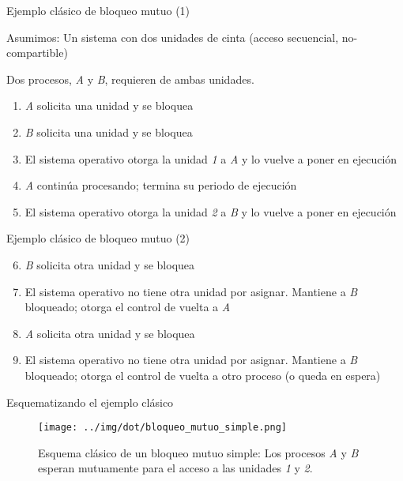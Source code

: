 \documentclass[presentation]{beamer}
\begin{document}
\begin{frame}[label={sec:org3f34a5a}]{Ejemplo clásico de bloqueo mutuo (1)}
\begin{center}
Asumimos: Un sistema con dos unidades de cinta (acceso secuencial,
no-compartible)

Dos procesos, \emph{A} y \emph{B}, requieren de ambas unidades.
\end{center}

\begin{enumerate}
\item \emph{A} solicita una unidad y se bloquea

\item \emph{B} solicita una unidad y se bloquea

\item El sistema operativo otorga la unidad \emph{1} a \emph{A} y lo vuelve a poner
en ejecución

\item \emph{A} continúa procesando; termina su periodo de ejecución

\item El sistema operativo otorga la unidad \emph{2} a \emph{B} y lo vuelve a poner
en ejecución
\end{enumerate}
\end{frame}

\begin{frame}[label={sec:orgf90b6e7}]{Ejemplo clásico de bloqueo mutuo (2)}
\begin{enumerate}
\setcounter{enumi}{5}
\item \emph{B} solicita otra unidad y se bloquea

\item El sistema operativo no tiene otra unidad por asignar. Mantiene a
\emph{B} bloqueado; otorga el control de vuelta a \emph{A}

\item \emph{A} solicita otra unidad y se bloquea

\item El sistema operativo no tiene otra unidad por asignar. Mantiene a
\emph{B} bloqueado; otorga el control de vuelta a otro proceso (o queda
en espera)
\end{enumerate}
\end{frame}

\begin{frame}[label={sec:org825a86d}]{Esquematizando el ejemplo clásico}
\begin{figure}[htbp]
\centering
\texttt{[image: ../img/dot/bloqueo\_mutuo\_simple.png]}
\caption{Esquema clásico de un bloqueo mutuo simple: Los procesos \emph{A} y \emph{B} esperan mutuamente para el acceso a las unidades \emph{1} y \emph{2}.}
\end{figure}
\end{frame}
\end{document}
